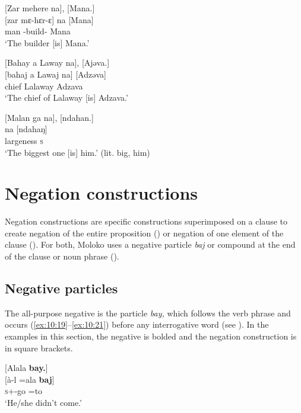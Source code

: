 \ea \label{ex:10:16}
{}[Zar  mehere   na],  [Mana.]\\
\gll  {}[zar    mɛ-hɛr-ɛ]    na  [Mana]\\
      man   {\NOM}{}-build-{\CL}   {\PSP}  Mana\\
\glt  ‘The builder [is] Mana.’ 
\z

\ea \label{ex:10:17}
{}[Bahay  a  Laway  na],  [Ajəva.]\\
\gll  {}[bahaj   a   Lawaj     na]  [Adzəva]\\
      chief  {\GEN}  Lalaway    {\PSP}  Adzava\\
\glt  ‘The chief of Lalaway [is] Adzava.’
\z

\ea \label{ex:10:18}
{}[Malan  ga   na],  [ndahan.]\\
\gll  [malaŋ   ga]    na  [ndahaŋ]\\
      largeness  {\ADJ}    {\PSP}  \textsc{s}\\
\glt  ‘The biggest one [is] him.’ (lit. big, him)
\z

\section{Negation constructions}\label{sec:10.2}
\hypertarget{RefHeading1212901525720847}{}
Negation constructions are specific constructions superimposed on a clause to create negation of the entire proposition () or negation of one element of the clause (). For both, Moloko uses a negative particle \textit{baj} or compound at the end of the clause or noun phrase ().

\subsection{Negative particles}\label{sec:10.2.1}
\hypertarget{RefHeading1212921525720847}{}
The all-purpose negative is the particle \textit{bay,} which follows the verb phrase and occurs (\ref{ex:10:19}--\ref{ex:10:21}) before any interrogative word (see ). In the examples in this section, the negative is bolded and the negation construction is in square brackets. 

\ea \label{ex:10:19}
{}[Alala  \textbf{bay.}]\\
\gll  {}[à-l    =ala    \textbf{baj}]\\
      \textsc{s}+{\PFV}-go  =to    {\NEG}\\
\glt  ‘He/she didn’t come.’
\z

